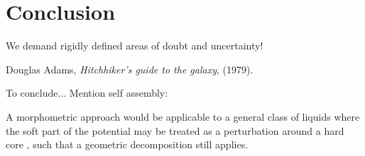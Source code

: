 \documentclass[11pt,twoside]{report}
\def\includebibliography{}
\begin{document}
\chapter{Conclusion}
\epigraph{We demand rigidly defined areas of doubt and uncertainty!}{Douglas Adams, \emph{Hitchhiker's guide to the galaxy}, (1979).}

To conclude...
Mention self assembly: \cite{TeichNC2019}

A morphometric approach would be applicable to a general class of liquids where the soft part of the potential may be treated as a perturbation around a hard core \cite{Hansen2013}, such that a geometric decomposition still applies.

\ifdefined\includebibliography
  \printbibliography
\fi
\end{document}
